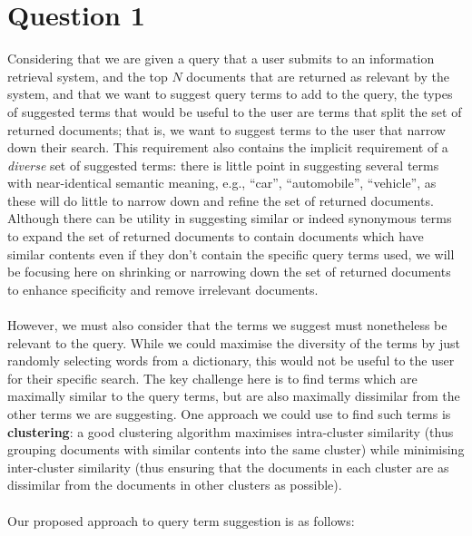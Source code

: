 \documentclass[a4paper]{article}
\begin{document}
\section{Question 1}
Considering that we are given a query that a user submits to an information retrieval system, and the top $N$ documents that are returned as relevant by the system, and that we want to suggest query terms to add to the query, the types of suggested terms that would be useful to the user are terms that split the set of returned documents;
that is, we want to suggest terms to the user that narrow down their search.
This requirement also contains the implicit requirement of a \textit{diverse} set of suggested terms: there is little point in suggesting several terms with near-identical semantic meaning, e.g., ``car'', ``automobile'', ``vehicle'', as these will do little to narrow down and refine the set of returned documents.
Although there can be utility in suggesting similar or indeed synonymous terms to expand the set of returned documents to contain documents which have similar contents even if they don't contain the specific query terms used, we will be focusing here on shrinking or narrowing down the set of returned documents to enhance specificity and remove irrelevant documents.
\\\\
However, we must also consider that the terms we suggest must nonetheless be relevant to the query.
While we could maximise the diversity of the terms by just randomly selecting words from a dictionary, this would not be useful to the user for their specific search.
The key challenge here is to find terms which are maximally similar to the query terms, but are also maximally dissimilar from the other terms we are suggesting.
One approach we could use to find such terms is \textbf{clustering}: a good clustering algorithm maximises intra-cluster similarity (thus grouping documents with similar contents into the same cluster)  while minimising inter-cluster similarity (thus ensuring that the documents in each cluster are as dissimilar from the documents in other clusters as possible).
\\\\
Our proposed approach to query term suggestion is as follows: 
\end{document}
